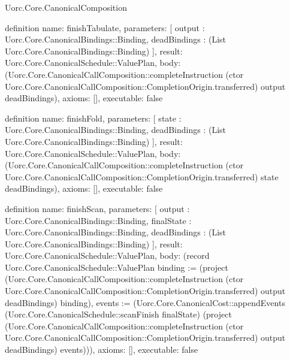 \begin{lexlean}{Uorc.Core.CanonicalComposition}
\begin{semanticmodule}
definition{
  name: finishTabulate,
  parameters: [
    output : Uorc.Core.CanonicalBindings::Binding,
    deadBindings : (List Uorc.Core.CanonicalBindings::Binding)
  ],
  result: Uorc.Core.CanonicalSchedule::ValuePlan,
  body: (Uorc.Core.CanonicalCallComposition::completeInstruction (ctor Uorc.Core.CanonicalCallComposition::CompletionOrigin.transferred) output deadBindings),
  axioms: [],
  executable: false
}

definition{
  name: finishFold,
  parameters: [
    state : Uorc.Core.CanonicalBindings::Binding,
    deadBindings : (List Uorc.Core.CanonicalBindings::Binding)
  ],
  result: Uorc.Core.CanonicalSchedule::ValuePlan,
  body: (Uorc.Core.CanonicalCallComposition::completeInstruction (ctor Uorc.Core.CanonicalCallComposition::CompletionOrigin.transferred) state deadBindings),
  axioms: [],
  executable: false
}

definition{
  name: finishScan,
  parameters: [
    output : Uorc.Core.CanonicalBindings::Binding,
    finalState : Uorc.Core.CanonicalBindings::Binding,
    deadBindings : (List Uorc.Core.CanonicalBindings::Binding)
  ],
  result: Uorc.Core.CanonicalSchedule::ValuePlan,
  body: (record Uorc.Core.CanonicalSchedule::ValuePlan {binding := (project (Uorc.Core.CanonicalCallComposition::completeInstruction (ctor Uorc.Core.CanonicalCallComposition::CompletionOrigin.transferred) output deadBindings) binding), events := (Uorc.Core.CanonicalCost::appendEvents (Uorc.Core.CanonicalSchedule::scanFinish finalState) (project (Uorc.Core.CanonicalCallComposition::completeInstruction (ctor Uorc.Core.CanonicalCallComposition::CompletionOrigin.transferred) output deadBindings) events))}),
  axioms: [],
  executable: false
}
\end{semanticmodule}
\end{lexlean}
